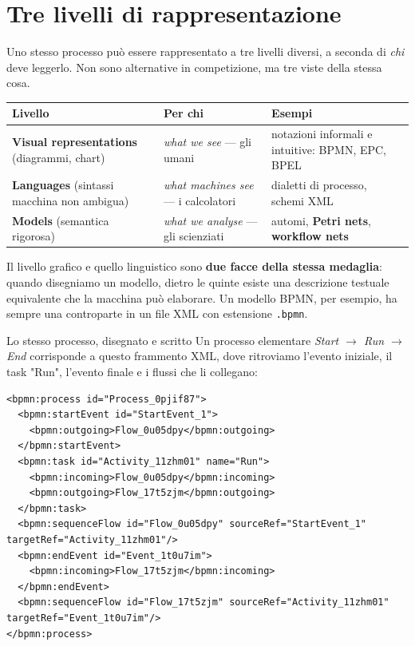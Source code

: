 \section{\texorpdfstring{Tre livelli di rappresentazione}{Tre livelli di rappresentazione}}

Uno stesso processo può essere rappresentato a tre livelli diversi, a seconda di \emph{chi} deve leggerlo. Non sono alternative in competizione, ma tre viste della stessa cosa.

\begingroup\small
\begin{tabularx}{\linewidth}{>{\raggedright\arraybackslash}X>{\raggedright\arraybackslash}X>{\raggedright\arraybackslash}X}
\toprule
\textbf{Livello} & \textbf{Per chi} & \textbf{Esempi} \\
\midrule
\textbf{Visual representations} (diagrammi, chart) & \emph{what we see} — gli umani & notazioni informali e intuitive: BPMN, EPC, BPEL \\
\textbf{Languages} (sintassi macchina non ambigua) & \emph{what machines see} — i calcolatori & dialetti di processo, schemi XML \\
\textbf{Models} (semantica rigorosa) & \emph{what we analyse} — gli scienziati & automi, \textbf{Petri nets}, \textbf{workflow nets} \\
\bottomrule
\end{tabularx}
\endgroup

Il livello grafico e quello linguistico sono \textbf{due facce della stessa medaglia}: quando disegniamo un modello, dietro le quinte esiste una descrizione testuale equivalente che la macchina può elaborare. Un modello BPMN, per esempio, ha sempre una controparte in un file XML con estensione \texttt{.bpmn}.

\begin{boxexample}{Lo stesso processo, disegnato e scritto}
Un processo elementare \emph{Start $\rightarrow$ Run $\rightarrow$ End} corrisponde a questo frammento XML, dove ritroviamo l'evento iniziale, il task "Run", l'evento finale e i flussi che li collegano:

\begin{Verbatim}[fontsize=\small]
<bpmn:process id="Process_0pjif87">
  <bpmn:startEvent id="StartEvent_1">
    <bpmn:outgoing>Flow_0u05dpy</bpmn:outgoing>
  </bpmn:startEvent>
  <bpmn:task id="Activity_11zhm01" name="Run">
    <bpmn:incoming>Flow_0u05dpy</bpmn:incoming>
    <bpmn:outgoing>Flow_17t5zjm</bpmn:outgoing>
  </bpmn:task>
  <bpmn:sequenceFlow id="Flow_0u05dpy" sourceRef="StartEvent_1" targetRef="Activity_11zhm01"/>
  <bpmn:endEvent id="Event_1t0u7im">
    <bpmn:incoming>Flow_17t5zjm</bpmn:incoming>
  </bpmn:endEvent>
  <bpmn:sequenceFlow id="Flow_17t5zjm" sourceRef="Activity_11zhm01" targetRef="Event_1t0u7im"/>
</bpmn:process>
\end{Verbatim}
\end{boxexample}

